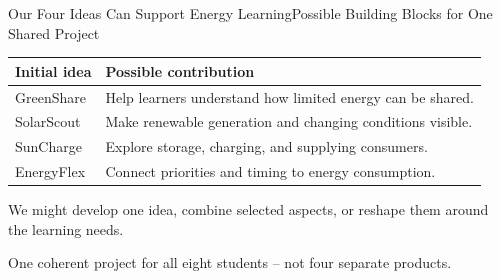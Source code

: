 \begin{frame}{Our Four Ideas Can Support Energy Learning}{Possible Building Blocks for One Shared Project}
\renewcommand{\arraystretch}{1.35}
\par\noindent\begin{tabularx}{\textwidth}{@{}l>{\raggedright\arraybackslash}X@{}}
\toprule
\textbf{Initial idea} & \textbf{Possible contribution}\\\midrule
GreenShare & Help learners understand how limited energy can be shared.\\
SolarScout & Make renewable generation and changing conditions visible.\\
SunCharge & Explore storage, charging, and supplying consumers.\\
EnergyFlex & Connect priorities and timing to energy consumption.\\\bottomrule
\end{tabularx}\par
\begin{center}
\end{center}
\small We might develop one idea, combine selected aspects, or reshape them around the learning needs.\par
\alert{One coherent project for all eight students -- not four separate products.}
\end{frame}

